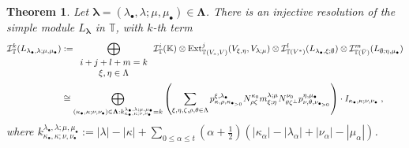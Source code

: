 \documentclass[12pt]{article}
\def\KK {{\mathbb K}}     %
\def\TT {{\mathbb T}}     %
\def\mc {\mathcal}
\newtheorem{theorem}{Theorem}[section]
\begin{document}
\begin{theorem}\label{Theo InjResLlambdamu TT}
Let $\bm\lambda=(\lambda_\bullet,\lambda;\mu,\mu_\bullet)\in \bm\Lambda$. There is an injective resolution of the simple module $L_{\bm\lambda}$ in $\TT$, with $k$-th term
\begin{align*}
\mc I_{\TT}^{k}(L_{\lambda_\bullet,\lambda;\mu,\mu_\bullet}) & := \bigoplus\limits_{\begin{array}{c}i+j+l+m=k\\ \xi,\eta\in\Lambda\end{array}} \mc I_{\TT}^i(\KK)\otimes {\rm Ext}_{\TT(V_*,V)}^j(V_{\xi,\eta},V_{\lambda;\mu})\otimes \mc I_{\TT(V^*)}^{l}(L_{\lambda_{\bullet},\xi;\emptyset})\otimes \mc I_{\TT(\bar V)}^{m}(L_{\emptyset;\eta,\mu_\bullet}) \\
&\cong \bigoplus\limits_{(\kappa_\bullet,\kappa;\nu,\nu_\bullet)\in\bm\Lambda:k^{\lambda_\bullet,\lambda;\mu,\mu_\bullet}_{\kappa_\bullet,\kappa;\nu,\nu_\bullet}=k} \left(\sum\limits_{\xi,\eta,\zeta,\rho,\theta\in\Lambda} p^{\xi,\lambda_{\bullet}}_{\kappa,\rho,\kappa_{\bullet_{>0}}} N^{\kappa_0}_{\rho\zeta} m^{\lambda;\mu}_{\xi;\eta} N^{\nu_0}_{\theta\zeta^\perp} p^{\eta,\mu_\bullet}_{\nu,\theta,\nu_{\bullet_{>0}}} \right) \cdot I_{\kappa_\bullet,\kappa;\nu,\nu_\bullet} \;,
\end{align*}
where $k^{\lambda_\bullet,\lambda;\mu,\mu_\bullet}_{\kappa_\bullet,\kappa;\nu,\nu_\bullet}:=|\lambda|-|\kappa|+\sum\limits_{0\leq\alpha\leq t}(\alpha+\frac12)(|\kappa_\alpha|-|\lambda_\alpha|+|\nu_\alpha|-|\mu_\alpha|)$.
\end{theorem}
\end{document}
